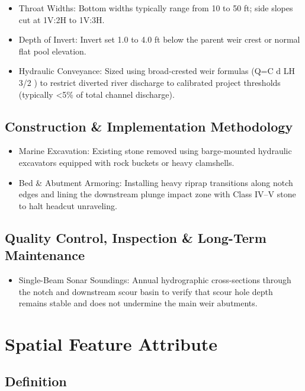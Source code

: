 \documentclass[
  letterpaper,
  DIV=11,
  numbers=noendperiod]{scrreprt}
\providecommand{\tightlist}{%
  \setlength{\itemsep}{0pt}\setlength{\parskip}{0pt}}
\begin{document}
\begin{itemize}
\item
  Throat Widths: Bottom widths typically range from 10 to 50 ft; side
  slopes cut at 1V:2H to 1V:3H.
\item
  Depth of Invert: Invert set 1.0 to 4.0 ft below the parent weir crest
  or normal flat pool elevation.
\item
  Hydraulic Conveyance: Sized using broad-crested weir formulas (Q=C d
  LH 3/2 ) to restrict diverted river discharge to calibrated project
  thresholds (typically \textless5\% of total channel discharge).
\end{itemize}

\subsection{Construction \& Implementation
Methodology}\label{construction-implementation-methodology-9}

\begin{itemize}
\item
  Marine Excavation: Existing stone removed using barge-mounted
  hydraulic excavators equipped with rock buckets or heavy clamshells.
\item
  Bed \& Abutment Armoring: Installing heavy riprap transitions along
  notch edges and lining the downstream plunge impact zone with Class
  IV--V stone to halt headcut unraveling.
\end{itemize}

\subsection{Quality Control, Inspection \& Long-Term
Maintenance}\label{quality-control-inspection-long-term-maintenance-9}

\begin{itemize}
\tightlist
\item
  Single-Beam Sonar Soundings: Annual hydrographic cross-sections
  through the notch and downstream scour basin to verify that scour hole
  depth remains stable and does not undermine the main weir abutments.
\end{itemize}

\section{Spatial Feature Attribute}\label{spatial-feature-attribute-6}

\subsection{Definition}\label{definition-8}
\end{document}
